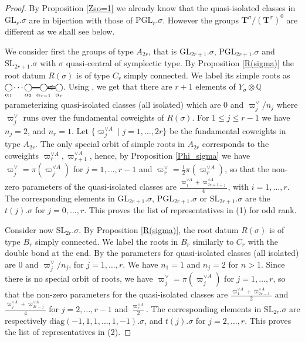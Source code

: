 \documentclass{amsart}
\numberwithin{equation}{section}
\theoremstyle{definition}
\theoremstyle{remark}
\newcommand\bT{{\mathbf T}}
\newcommand\BQ{{\mathbb Q}}
\newcommand\Tso{{(\bT^\sigma)^0}}
\newcommand\Ts{{\bT^\sigma}}
\newcommand\GL{\mathrm{GL}}
\newcommand\SL{\mathrm{SL}}
\newcommand\PGL{\mathrm{PGL}}
\newcommand\diag{\mathrm{diag}}
\newcommand{\nnode}[1]{{\kern 4.5pt\hbox to
0pt{\hss{$\mathop\bigcirc\limits_{#1}$}\hss}\kern 4.4pt}}
\newcommand{\sbar}{{\vrule width10pt height3pt depth-2pt}}
\newcommand{\dbar}{{\rlap{\vrule width10pt height2pt depth-1pt} 
                 \vrule width10pt height4pt depth-3pt}}
\begin{document}
\begin{proof}
By Proposition \ref{Zso=1} we already know  that  the  quasi-isolated classes 
in $\GL_r.\sigma$  are in bijection with those of $\PGL_r.\sigma$.  However
the groups $\Ts/\Tso$ are different as we shall see below.

We consider first
the groups of type $A_{2r}$, that is $\GL_{2r+1}.\sigma$,
$\PGL_{2r+1}.\sigma$ and $\SL_{2r+1}.\sigma$ with $\sigma$ quasi-central of
symplectic  type. By Proposition \ref{R(sigma)}  the root datum $R(\sigma)$
is  of type $C_r$  simply connected. We label its simple roots as
$\nnode{\alpha_1}\cdots\nnode{\alpha_2}\sbar\nnode{\alpha_{r-1}}
{\rlap{$<$}\dbar}\nnode{\alpha_r}$.
Using  \cite[Proposition 4.9]{cedric}, we
get   that  there   are  $r+1$  elements of $Y_\sigma\otimes\BQ$
parameterizing quasi-isolated classes (all isolated) which are $0$ and 
$\varpi_j^\vee/n_j$
where  $\varpi_j^\vee$ runs over the  fundamental coweights of $R(\sigma)$.
For $1\leq j \leq r-1$ we have $n_j=2$, and $n_r=1$.
Let
$\{\varpi^{\vee A}_j\mid  j=1,\ldots,2r\}$ be  the fundamental  coweights in
type  $A_{2r}$.  The  only  special  orbit  of  simple  roots  in  $A_{2r}$
corresponds   to  the   coweights  $\varpi^{\vee A}_r,\varpi^{\vee A}_{r+1}$,
hence, by Proposition \ref{Phi_sigma} we have
$\varpi_j^\vee=\pi(\varpi^{\vee A}_j)$      for     $j=1,\ldots,r-1$     and
$\varpi_r^\vee=\frac12\pi(\varpi^{\vee A}_r)$,  so  that  the
non-zero   parameters  of   the  quasi-isolated  classes  are
$\frac{\varpi^{\vee A}_j+\varpi^{\vee A}_{2r+1-j}}4$, with $i=1,\ldots,r$.
The    corresponding elements in $\GL_{2r+1}.\sigma$, $\PGL_{2r+1}.\sigma$ or
$\SL_{2r+1}.\sigma$  are  the  $t(j).\sigma$  for  $j=0,\ldots,r$. This proves
the list of representatives in (1) for odd rank.

Consider  now  $\SL_{2r}.\sigma$.  By  Proposition \ref{R(sigma)}, the root
datum  $R(\sigma)$ is of type  $B_r$ simply connected. We label the
roots in $B_r$ similarly to $C_r$ with the double bond at the end.
By \cite[Proposition
4.9]{cedric}  the parameters for quasi-isolated  classes (all isolated) are
$0$  and $\varpi_j^\vee/n_j$,  for $j=1,\ldots,r$.
We have  $n_1=1$ and  $n_j=2$ for $n>1$. Since
there is no special orbit of roots, we have $\varpi_j^\vee=\pi(\varpi^{\vee
A}_j)$  for  $j=1,\ldots,r$,  so  that  the  non-zero  parameters  for  the
quasi-isolated  classes  are  $\frac{\varpi_1^{\vee  A}+\varpi_{2r-1}^{\vee
A}}2$    and   $\frac{\varpi_j^{\vee   A}+\varpi_{2r-j}^{\vee   A}}4$   for
$j=2,\ldots,r-1$   and   $\frac{\varpi_r^{\vee   A}}2$.  The  corresponding
elements in $\SL_{2r}.\sigma$ are respectively
$\diag(-1,1,1,\ldots,1,-1).\sigma$,  and  $t(j).\sigma$  for  $j=2,\ldots,r$. 
This proves the list of representatives in (2).


\end{proof}
\end{document}
